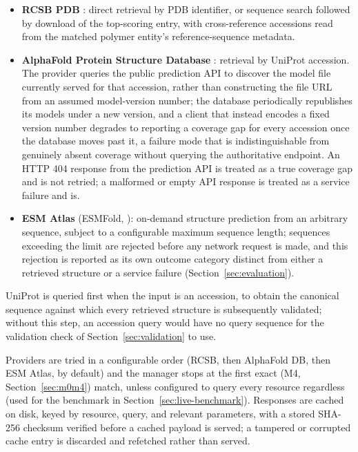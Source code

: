 \begin{itemize}[leftmargin=1.4em]
  \item \textbf{RCSB PDB} \citep{berman2000pdb}: direct retrieval by PDB
  identifier, or sequence search followed by download of the top-scoring
  entry, with cross-reference accessions read from the matched polymer
  entity's reference-sequence metadata.
  \item \textbf{AlphaFold Protein Structure Database}
  \citep{varadi2022alphafolddb}: retrieval by UniProt accession. The
  provider queries the public prediction API to discover the model file
  currently served for that accession, rather than constructing the file
  URL from an assumed model-version number; the database periodically
  republishes its models under a new version, and a client that instead
  encodes a fixed version number degrades to reporting a coverage gap for
  every accession once the database moves past it, a failure mode that is
  indistinguishable from genuinely absent coverage without querying the
  authoritative endpoint. An HTTP 404 response from the prediction API is
  treated as a true coverage gap and is not retried; a malformed or empty
  API response is treated as a service failure and is.
  \item \textbf{ESM Atlas} (ESMFold, \citealp{lin2023esmfold}): on-demand
  structure prediction from an arbitrary sequence, subject to a configurable
  maximum sequence length; sequences exceeding the limit are rejected before
  any network request is made, and this rejection is reported as its own
  outcome category distinct from either a retrieved structure or a service
  failure (Section~\ref{sec:evaluation}).
\end{itemize}

UniProt \citep{uniprot2023} is queried first when the input is an
accession, to obtain the canonical sequence against which every retrieved
structure is subsequently validated; without this step, an accession query
would have no query sequence for the validation check of
Section~\ref{sec:validation} to use.

Providers are tried in a configurable order (RCSB, then AlphaFold DB, then
ESM Atlas, by default) and the manager stops at the first exact (M4,
Section~\ref{sec:m0m4}) match, unless configured to query every resource
regardless (used for the benchmark in Section~\ref{sec:live-benchmark}).
Responses are cached on disk, keyed by resource, query, and relevant
parameters, with a stored SHA-256 checksum verified before a cached payload
is served; a tampered or corrupted cache entry is discarded and refetched
rather than served.

